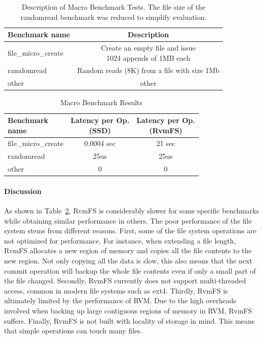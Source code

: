 \begin{table}[h]
\centering
\caption{Description of Macro Benchmark Tests. The file size of the randomread benchmark was reduced to simplify evaluation.}
\label{tab:description}
\begin{tabular}{ | l | c |} 
\hline
Benchmark name & Description \\
\hline
\hline
file\_micro\_create  & \pbox{20cm}{Create an empty file and issue\\ 1024 appends of 1MB each} \\
ramdomread  & Random reads (8K) from a file with size 1Mb \\
other  & other \\
\hline
\end{tabular}
\end{table}

\begin{table}[h]
\centering
\caption{Macro Benchmark Results}
\label{tab:results}
\begin{tabular}{ | l | c | c |} 
\hline
\pbox{20cm}{Benchmark\\ name} & \pbox{20cm}{Latency per Op.\\ (SSD)} & \pbox{20cm}{Latency per Op.\\ (RvmFS)} \\
\hline
\hline
file\_micro\_create  & 0.0004 sec & 21 sec\\
randomread  & 25us & 25us \\
other  & 0 & 0 \\
\hline
\end{tabular}
\end{table}

\paragraph{Discussion}

As shown in Table~\ref{tab:results}, RvmFS is considerably slower for some specific benchmarks while obtaining similar performance in others.
The poor performance of the file system stems from different reasons.
First, some of the file system operations are not optimized for performance. For instance, when extending a file length, RvmFS allocates a new region of memory and copies all the file contents
to the new region. Not only copying all the data is slow, this also means that the next commit operation will backup the whole file contents even if only a small part of the file changed.
Secondly, RvmFS currently does not support multi-threaded access, common in modern file systems such as ext4.
Thirdly, RvmFS is ultimately limited by the performance of RVM. Due to the high overheads involved when backing up large contiguous regions of memory in RVM, RvmFS suffers.
Finally, RvmFS is not built with locality of storage in mind. This means that simple operations can touch many files.

